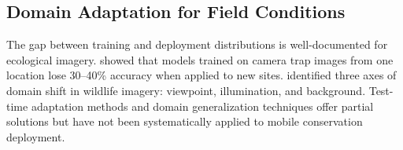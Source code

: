 \subsection{Domain Adaptation for Field Conditions}

The gap between training and deployment distributions is well-documented for ecological imagery.
\citet{beery2018recognition} showed that models trained on camera trap images from one location lose 30--40\% accuracy when applied to new sites.
\citet{schneider2020three} identified three axes of domain shift in wildlife imagery: viewpoint, illumination, and background.
Test-time adaptation methods \citep{wang2022continual} and domain generalization techniques \citep{zhou2022domain} offer partial solutions but have not been systematically applied to mobile conservation deployment.

